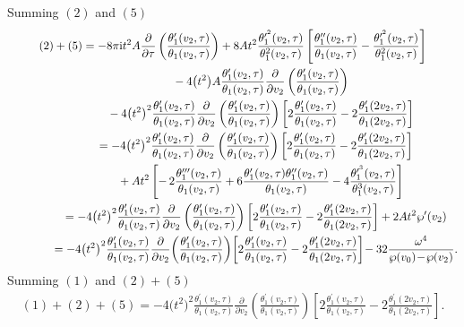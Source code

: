 \documentclass[pdftex]{sigma}%
\numberwithin{equation}{section}
\begin{document}
Summing $(2)$ and $(5)$
\begin{gather*}
(2)+(5)=-8\pi {\rm i}t^2A\frac{\partial}{\partial \tau}\left(\frac{\theta_1^{\prime}(v_2,\tau)}{\theta_1(v_2,\tau)}\right) +8At^2\frac{\theta_1^{\prime^2}(v_2,\tau)}{\theta_1^2(v_2,\tau)} \left[\frac{\theta_1^{\prime\prime}(v_2,\tau)}{\theta_1(v_2,\tau)} -\frac{\theta_1^{\prime^2}(v_2,\tau)}{\theta_1^2(v_2,\tau)}\right]
\\ \hphantom{(2)+(5)=}
-4\big(t^2\big)A\frac{\theta_1^{\prime}(v_2,\tau)}{\theta_1(v_2,\tau)}\frac{\partial}{\partial v_2}\left(\frac{\theta_1^{\prime}(v_2,\tau)}{\theta_1(v_2,\tau)}\right)
\\ \hphantom{(2)+(5)=}
-4\big(t^2\big)^2\frac{\theta_1^{\prime}(v_2,\tau)}{\theta_1(v_2,\tau)}\frac{\partial}{\partial v_2}\left(\frac{\theta_1^{\prime}(v_2,\tau)}{\theta_1(v_2,\tau)}\right)\left[ 2\frac{\theta_1^{\prime}(v_2,\tau)}{\theta_1(v_2,\tau)} -2\frac{\theta_1^{\prime}(2v_2,\tau)}{\theta_1(2v_2,\tau)}\right]
\\ \hphantom{(2)+(5)}
=-4\big(t^2\big)^2\frac{\theta_1^{\prime}(v_2,\tau)}{\theta_1(v_2,\tau)}\frac{\partial}{\partial v_2}\left(\frac{\theta_1^{\prime}(v_2,\tau)}{\theta_1(v_2,\tau)}\right)\left[ 2\frac{\theta_1^{\prime}(v_2,\tau)}{\theta_1(v_2,\tau)} -2\frac{\theta_1^{\prime}(2v_2,\tau)}{\theta_1(2v_2,\tau)}\right]
\\ \hphantom{(2)+(5)=}
+At^2\left[{-}\,2\frac{\theta_1^{\prime\prime\prime}(v_2,\tau)}{\theta_1(v_2,\tau)} +6\frac{\theta_1^{\prime}(v_2,\tau)\theta_1^{\prime\prime}(v_2,\tau)}{\theta_1(v_2,\tau)} -4\frac{\theta_1^{\prime^3}(v_2,\tau)}{\theta^3_1(v_2,\tau)}\right]
\\ \hphantom{(2)+(5)}
=-4\big(t^2\big)^2\frac{\theta_1^{\prime}(v_2,\tau)}{\theta_1(v_2,\tau)}\frac{\partial}{\partial v_2}\left(\frac{\theta_1^{\prime}(v_2,\tau)}{\theta_1(v_2,\tau)}\right)\left[ 2\frac{\theta_1^{\prime}(v_2,\tau)}{\theta_1(v_2,\tau)} -2\frac{\theta_1^{\prime}(2v_2,\tau)}{\theta_1(2v_2,\tau)}\right]
+2At^2\wp^{\prime}(v_2)
\\ \hphantom{(2)+(5)}
=-4\big(t^2\big)^2\frac{\theta_1^{\prime}(v_2,\tau)}{\theta_1(v_2,\tau)}\frac{\partial}{\partial v_2}\!\left(\frac{\theta_1^{\prime}(v_2,\tau)}{\theta_1(v_2,\tau)}\right)\!\left[ 2\frac{\theta_1^{\prime}(v_2,\tau)}{\theta_1(v_2,\tau)} -2\frac{\theta_1^{\prime}(2v_2,\tau)}{\theta_1(2v_2,\tau)}\right]\!
-32\frac{\omega^4}{\wp(v_0)\!-\!\wp(v_2)}.
\end{gather*}
Summing $(1)$ and $(2)+(5)$
\begin{gather*}
(1)+(2)+(5)=-4\big(t^2\big)^2\frac{\theta_1^{\prime}(v_2,\tau)}{\theta_1(v_2,\tau)}\frac{\partial}{\partial v_2}\left(\frac{\theta_1^{\prime}(v_2,\tau)}{\theta_1(v_2,\tau)}\right)\left[ 2\frac{\theta_1^{\prime}(v_2,\tau)}{\theta_1(v_2,\tau)} -2\frac{\theta_1^{\prime}(2v_2,\tau)}{\theta_1(2v_2,\tau)}\right].
\end{gather*}
\end{document}
